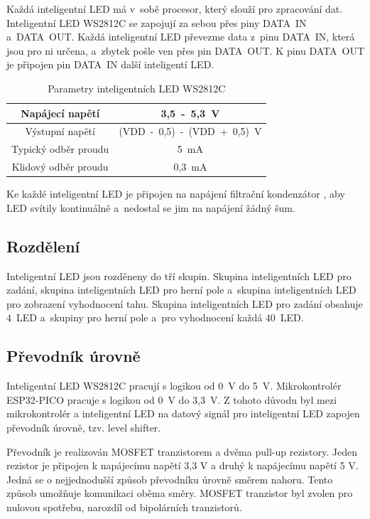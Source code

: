   Každá inteligentní LED má v~sobě procesor, který slouží pro zpracování dat. 
  Inteligentní LED WS2812C se zapojují za sebou přes piny DATA~IN a~DATA~OUT. Každá inteligentní LED převezme data z~pinu 
  DATA~IN, která jsou pro ni určena, a~zbytek pošle ven přes pin DATA~OUT. K pinu DATA~OUT je připojen pin DATA~IN další inteligentí LED. 

  \begin{table}[!h]
    \caption{Parametry inteligentních LED WS2812C \cite{WS2812C_datasheet}}
    \begin{center}
        \begin{tabular}{|c|c|}
            \hline
            Napájecí napětí       & 3,5~-~5,3~V \\
            \hline
            Výstupní napětí       & (VDD~-~0,5)~-~(VDD~+~0,5)~V \\
            \hline
            Typický odběr proudu  & 5~mA \\
            \hline
            Klidový odběr proudu  & 0,3~mA \\
            \hline
        \end{tabular}    
    \end{center}
  \end{table}

  Ke každé inteligentní LED je připojen na napájení filtrační kondenzátor \cite{WS2812C_datasheet}, aby LED svítily kontinuálně 
  a~nedostal se jim na napájení žádný šum.

  \subsection{Rozdělení}
  Inteligentní LED jsou rozděneny do tří skupin. Skupina inteligentních LED pro zadání, skupina inteligentních LED pro herní pole 
  a~skupina inteligentních LED pro zobrazení vyhodnocení tahu.
  Skupina inteligentních LED pro zadání obsahuje 4~LED a~skupiny pro herní pole a~pro vyhodnocení každá 40~LED.

  \subsection{Převodník úrovně}
  Inteligentní LED WS2812C pracují s logikou od 0~V do 5~V. Mikrokontrolér ESP32-PICO pracuje s logikou od 0~V do 3,3~V. 
  Z tohoto důvodu byl mezi mikrokontrolér a inteligentní LED na datový signál pro inteligentní LED zapojen převodník úrovně, 
  tzv. level shifter. 
  
  Převodník je realizován MOSFET tranzistorem a dvěma pull-up rezistory. Jeden rezistor je připojen k napájecímu napětí 3,3 V a druhý k 
  napájecímu napětí 5 V. Jedná se o nejjednodušší způsob převodníku úrovně směrem nahoru. Tento způsob umožňuje komunikaci oběma směry. 
  MOSFET tranzistor byl zvolen pro nulovou spotřebu, narozdíl od bipolárních tranzistorů. 

